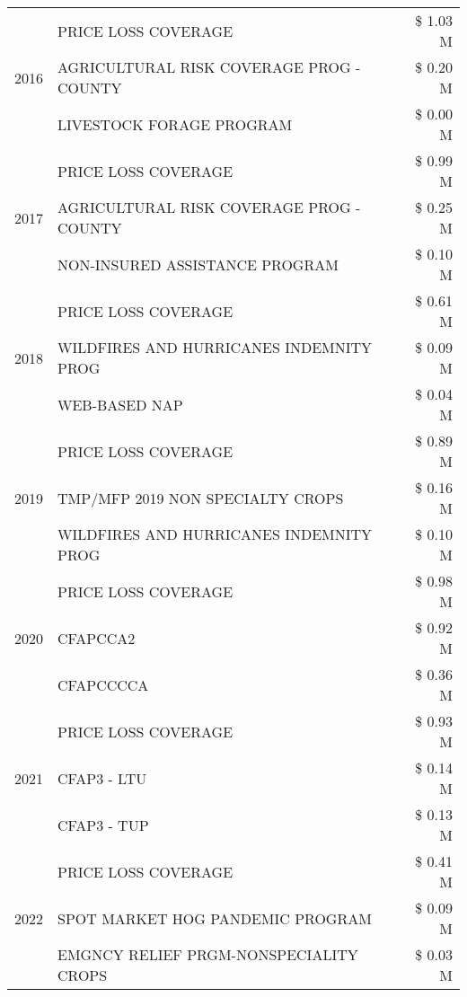 \begin{tabular}{llr}
\cline{1-3}
\multirow[t]{3}{*}{2016} & PRICE LOSS COVERAGE & \$ 1.03 M \\
 & AGRICULTURAL RISK COVERAGE PROG - COUNTY & \$ 0.20 M \\
 & LIVESTOCK FORAGE PROGRAM & \$ 0.00 M \\
\cline{1-3}
\multirow[t]{3}{*}{2017} & PRICE LOSS COVERAGE & \$ 0.99 M \\
 & AGRICULTURAL RISK COVERAGE PROG - COUNTY & \$ 0.25 M \\
 & NON-INSURED ASSISTANCE PROGRAM & \$ 0.10 M \\
\cline{1-3}
\multirow[t]{3}{*}{2018} & PRICE LOSS COVERAGE & \$ 0.61 M \\
 & WILDFIRES AND HURRICANES INDEMNITY PROG & \$ 0.09 M \\
 & WEB-BASED NAP & \$ 0.04 M \\
\cline{1-3}
\multirow[t]{3}{*}{2019} & PRICE LOSS COVERAGE & \$ 0.89 M \\
 & TMP/MFP 2019 NON SPECIALTY CROPS & \$ 0.16 M \\
 & WILDFIRES AND HURRICANES INDEMNITY PROG & \$ 0.10 M \\
\cline{1-3}
\multirow[t]{3}{*}{2020} & PRICE LOSS COVERAGE & \$ 0.98 M \\
 & CFAPCCA2 & \$ 0.92 M \\
 & CFAPCCCCA & \$ 0.36 M \\
\cline{1-3}
\multirow[t]{3}{*}{2021} & PRICE LOSS COVERAGE & \$ 0.93 M \\
 & CFAP3 - LTU & \$ 0.14 M \\
 & CFAP3 - TUP & \$ 0.13 M \\
\cline{1-3}
\multirow[t]{3}{*}{2022} & PRICE LOSS COVERAGE & \$ 0.41 M \\
 & SPOT MARKET HOG PANDEMIC PROGRAM & \$ 0.09 M \\
 & EMGNCY RELIEF PRGM-NONSPECIALITY CROPS & \$ 0.03 M \\
\cline{1-3}
\bottomrule
\end{tabular}
